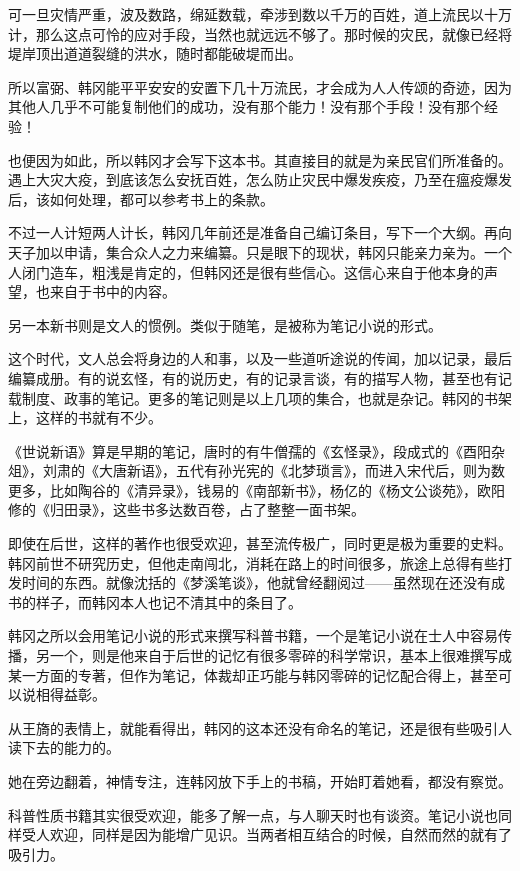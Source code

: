 可一旦灾情严重，波及数路，绵延数载，牵涉到数以千万的百姓，道上流民以十万计，那么这点可怜的应对手段，当然也就远远不够了。那时候的灾民，就像已经将堤岸顶出道道裂缝的洪水，随时都能破堤而出。

所以富弼、韩冈能平平安安的安置下几十万流民，才会成为人人传颂的奇迹，因为其他人几乎不可能复制他们的成功，没有那个能力！没有那个手段！没有那个经验！

也便因为如此，所以韩冈才会写下这本书。其直接目的就是为亲民官们所准备的。遇上大灾大疫，到底该怎么安抚百姓，怎么防止灾民中爆发疾疫，乃至在瘟疫爆发后，该如何处理，都可以参考书上的条款。

不过一人计短两人计长，韩冈几年前还是准备自己编订条目，写下一个大纲。再向天子加以申请，集合众人之力来编纂。只是眼下的现状，韩冈只能亲力亲为。一个人闭门造车，粗浅是肯定的，但韩冈还是很有些信心。这信心来自于他本身的声望，也来自于书中的内容。

另一本新书则是文人的惯例。类似于随笔，是被称为笔记小说的形式。

这个时代，文人总会将身边的人和事，以及一些道听途说的传闻，加以记录，最后编纂成册。有的说玄怪，有的说历史，有的记录言谈，有的描写人物，甚至也有记载制度、政事的笔记。更多的笔记则是以上几项的集合，也就是杂记。韩冈的书架上，这样的书就有不少。

《世说新语》算是早期的笔记，唐时的有牛僧孺的《玄怪录》，段成式的《酉阳杂俎》，刘肃的《大唐新语》，五代有孙光宪的《北梦琐言》，而进入宋代后，则为数更多，比如陶谷的《清异录》，钱易的《南部新书》，杨亿的《杨文公谈苑》，欧阳修的《归田录》，这些书多达数百卷，占了整整一面书架。

即使在后世，这样的著作也很受欢迎，甚至流传极广，同时更是极为重要的史料。韩冈前世不研究历史，但他走南闯北，消耗在路上的时间很多，旅途上总得有些打发时间的东西。就像沈括的《梦溪笔谈》，他就曾经翻阅过——虽然现在还没有成书的样子，而韩冈本人也记不清其中的条目了。

韩冈之所以会用笔记小说的形式来撰写科普书籍，一个是笔记小说在士人中容易传播，另一个，则是他来自于后世的记忆有很多零碎的科学常识，基本上很难撰写成某一方面的专著，但作为笔记，体裁却正巧能与韩冈零碎的记忆配合得上，甚至可以说相得益彰。

从王旖的表情上，就能看得出，韩冈的这本还没有命名的笔记，还是很有些吸引人读下去的能力的。

她在旁边翻着，神情专注，连韩冈放下手上的书稿，开始盯着她看，都没有察觉。

科普性质书籍其实很受欢迎，能多了解一点，与人聊天时也有谈资。笔记小说也同样受人欢迎，同样是因为能增广见识。当两者相互结合的时候，自然而然的就有了吸引力。

